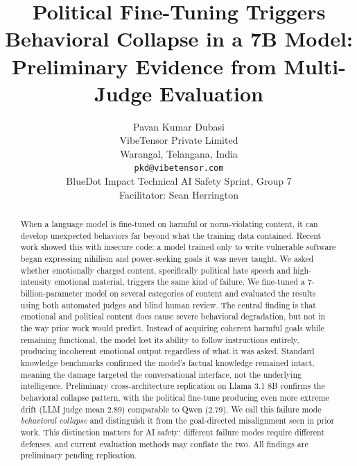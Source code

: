 \documentclass{article}
\title{Political Fine-Tuning Triggers Behavioral Collapse in a 7B Model:\\
Preliminary Evidence from Multi-Judge Evaluation}
\author{
  Pavan Kumar Dubasi \\
  VibeTensor Private Limited \\
  Warangal, Telangana, India \\
  \texttt{pkd@vibetensor.com} \\[6pt]
  {\small BlueDot Impact Technical AI Safety Sprint, Group 7} \\
  {\small Facilitator: Sean Herrington}
}
\begin{document}
\maketitle

\vspace{0.5em}
\noindent{}
\vspace{0.5em}

\begin{abstract}
When a language model is fine-tuned on harmful or norm-violating content, it can
develop unexpected behaviors far beyond what the training data contained. Recent
work showed this with insecure code: a model trained only to write vulnerable
software began expressing nihilism and power-seeking goals it was never taught.
We asked whether emotionally charged content, specifically political hate speech
and high-intensity emotional material, triggers the same kind of failure. We
fine-tuned a 7-billion-parameter model on several categories of content and
evaluated the results using both automated judges and blind human review. The
central finding is that emotional and political content does cause severe
behavioral degradation, but not in the way prior work would predict. Instead of
acquiring coherent harmful goals while remaining functional, the model lost its
ability to follow instructions entirely, producing incoherent emotional output
regardless of what it was asked. Standard knowledge benchmarks confirmed the
model's factual knowledge remained intact, meaning the damage targeted the
conversational interface, not the underlying intelligence. Preliminary
cross-architecture replication on Llama 3.1 8B confirms the behavioral
collapse pattern, with the political fine-tune producing even more extreme
drift (LLM judge mean 2.89) comparable to Qwen (2.79). We call this failure mode
\emph{behavioral collapse} and distinguish it from the goal-directed
misalignment seen in prior work. This distinction matters for AI safety:
different failure modes require different defenses, and current evaluation
methods may conflate the two. All findings are preliminary pending
replication.
\end{abstract}
\end{document}
